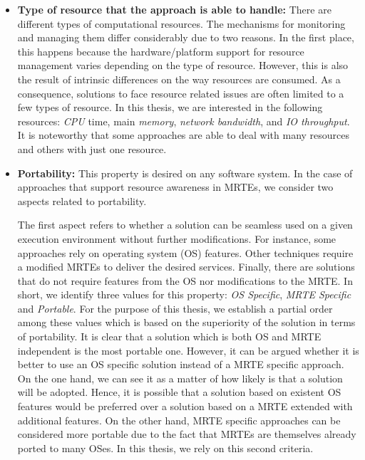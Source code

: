 \begin{itemize}
\item\textbf{Type of resource that the approach is able to handle:}
There are different types of computational resources.
The mechanisms for monitoring and managing them differ considerably due to two reasons.
In the first place, this happens because the hardware/platform support for resource management varies depending on the type of resource.
However, this is also the result of intrinsic differences on the way resources are consumed.
As a consequence, solutions to face resource related issues are often limited to a few types of resource.
In this thesis, we are interested in the following resources: \textit{CPU} time, main \textit{memory}, \textit{network bandwidth}, and \textit{IO throughput}.
It is noteworthy that some approaches are able to deal with many resources and others with just one resource. 


\item \textbf{Portability:}
This property is desired on any software system.
In the case of approaches that support resource awareness in MRTEs, we consider two aspects related to portability.

The first aspect refers to whether a solution can be seamless used on a given execution environment without further modifications.
For instance, some approaches rely on operating system (OS) features.
Other techniques require a modified MRTEs to deliver the desired services.
Finally, there are solutions that do not require features from the OS nor modifications to the MRTE.
In short, we identify three values for this property: \textit{OS Specific}, \textit{MRTE Specific} and \textit{Portable}.
For the purpose of this thesis, we establish a partial order among these values which is based on the superiority of the solution in terms of portability.
It is clear that a solution which is both OS and MRTE independent is the most portable one.
However, it can be argued whether it is better to use an OS specific solution instead of a MRTE specific approach.        
On the one hand, we can see it as a matter of how likely is that a solution will be adopted. 
Hence, it is possible that a solution based on existent OS features would be preferred over a solution based on a MRTE extended with additional features.
On the other hand, MRTE specific approaches can be considered more portable due to the fact that MRTEs are themselves already ported to many OSes.
In this thesis, we rely on this second criteria.


\end{itemize}
